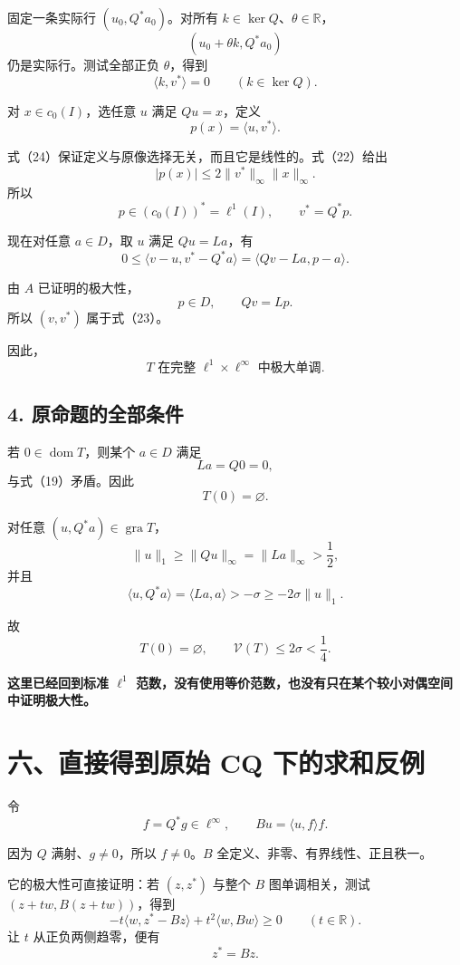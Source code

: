 \documentclass[UTF8,fontset=fandol,11pt,a4paper]{ctexart}
\begin{document}
固定一条实际行 $(u_0,Q^*a_0)$。对所有 $k\in\ker Q$、$\theta\in\mathbb R$， \[
(u_0+\theta k,Q^*a_0)
\] 仍是实际行。测试全部正负 $\theta$，得到 \[
\langle k,v^*\rangle=0
\qquad(k\in\ker Q).
\tag{24}
\]

对 $x\in c_0(I)$，选任意 $u$ 满足 $Qu=x$，定义 \[
p(x)=\langle u,v^*\rangle.
\]

式（24）保证定义与原像选择无关，而且它是线性的。式（22）给出 \[
|p(x)|\le2\|v^*\|_\infty\|x\|_\infty.
\] 所以 \[
p\in(c_0(I))^*=\ell^1(I),
\qquad v^*=Q^*p.
\tag{25}
\]

现在对任意 $a\in D$，取 $u$ 满足 $Qu=La$，有 \[
0\le\langle v-u,v^*-Q^*a\rangle
=\langle Qv-La,p-a\rangle.
\]

由 $A$ 已证明的极大性， \[
p\in D,\qquad Qv=Lp.
\] 所以 $(v,v^*)$ 属于式（23）。

因此， \[
\boxed{T\text{ 在完整 }\ell^1\times\ell^\infty\text{ 中极大单调}.}
\tag{26}
\]

\subsection{4. 原命题的全部条件}\label{ux539fux547dux9898ux7684ux5168ux90e8ux6761ux4ef6}

若 $0\in\operatorname{dom}T$，则某个 $a\in D$ 满足 \[
La=Q0=0,
\] 与式（19）矛盾。因此 \[
T(0)=\varnothing.
\]

对任意 $(u,Q^*a)\in\operatorname{gra}T$， \[
\|u\|_1\ge\|Qu\|_\infty=\|La\|_\infty>\frac12,
\] 并且 \[
\langle u,Q^*a\rangle
=\langle La,a\rangle
>-\sigma
\ge-2\sigma\|u\|_1.
\]

故 \[
\boxed{
T(0)=\varnothing,\qquad
\mathcal V(T)\le2\sigma<\frac14.
}
\tag{27}
\]

\textbf{这里已经回到标准 $\ell^1$ 范数，没有使用等价范数，也没有只在某个较小对偶空间中证明极大性。}

\section{六、直接得到原始 CQ 下的求和反例}\label{ux516dux76f4ux63a5ux5f97ux5230ux539fux59cb-cq-ux4e0bux7684ux6c42ux548cux53cdux4f8b}

令 \[
f=Q^*g\in\ell^\infty,
\qquad
Bu=\langle u,f\rangle f.
\tag{28}
\]

因为 $Q$ 满射、$g\ne0$，所以 $f\ne0$。$B$ 全定义、非零、有界线性、正且秩一。

它的极大性可直接证明：若 $(z,z^*)$ 与整个 $B$ 图单调相关，测试 $(z+tw,B(z+tw))$，得到 \[
-t\langle w,z^*-Bz\rangle
+t^2\langle w,Bw\rangle\ge0
\qquad(t\in\mathbb R).
\] 让 $t$ 从正负两侧趋零，便有 \[
z^*=Bz.
\]
\end{document}
